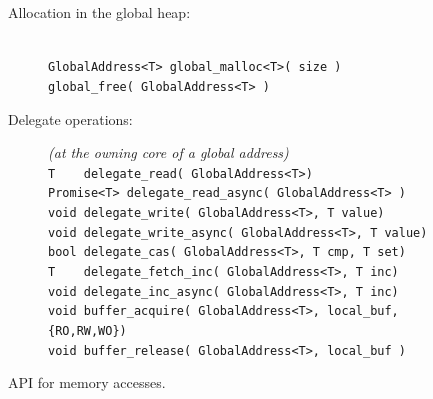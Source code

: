 \begin{figure}[htbp]
  \begin{center}
    \begin{minipage}{0.95\columnwidth}
	\small
  \begin{description}
    \item[Allocation in the global heap:] \hfill \\
      	\lstinline[style=grappa]{GlobalAddress<T> global_malloc<T>( size )} \hfill \\
      	\lstinline[style=grappa]{global_free( GlobalAddress<T> )}  \hfill
    \item[Delegate operations:] \emph{(at the owning core of a global address)} \hfill \\
      	\lstinline|T    delegate_read( GlobalAddress<T>)|  \hfill \\
      	\lstinline|Promise<T> delegate_read_async( GlobalAddress<T> )|  \hfill \\
      	\lstinline|void delegate_write( GlobalAddress<T>, T value)| \hfill \\
      	\lstinline|void delegate_write_async( GlobalAddress<T>, T value)| \hfill \\
      	\lstinline|bool delegate_cas( GlobalAddress<T>, T cmp, T set)| \hfill \\
      	\lstinline|T    delegate_fetch_inc( GlobalAddress<T>, T inc)| \hfill \\
      	\lstinline|void delegate_inc_async( GlobalAddress<T>, T inc)|  \hfill\\ 
        \lstinline|void buffer_acquire( GlobalAddress<T>, local_buf, {RO,RW,WO})| \hfill \\
        \lstinline|void buffer_release( GlobalAddress<T>, local_buf )| \hfill
	\end{description}
      \caption{\label{fig:accessing-memory} \Grappa API for memory accesses.}     \end{minipage}
  \end{center}
\end{figure}

